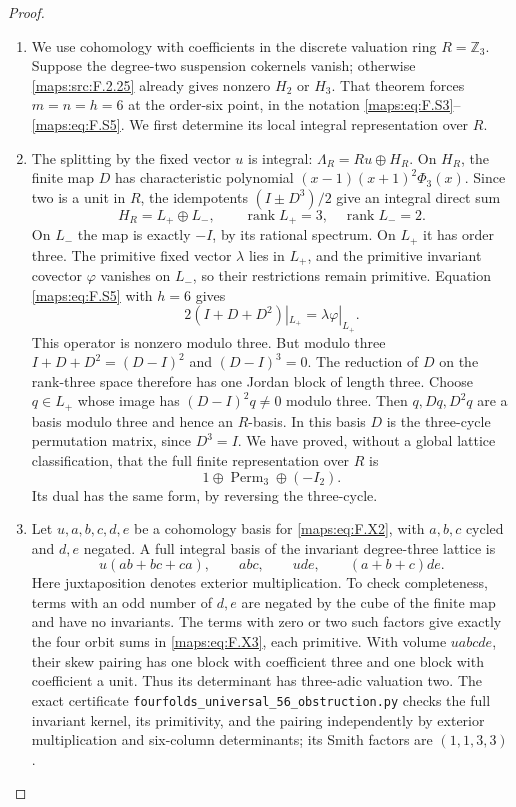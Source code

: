 \documentclass[11pt,a4paper]{article}
\theoremstyle{definition}
\begin{document}
\begin{proof}
\begin{enumerate}[label=\arabic*.]
\item We use cohomology with coefficients in the discrete valuation
ring $R=\mathbb Z_3$.  Suppose the degree-two suspension
cokernels vanish; otherwise \ref{maps:src:F.2.25} already gives nonzero
$H_2$ or $H_3$.  That theorem forces $m=n=h=6$ at the
order-six point, in the notation \eqref{maps:eq:F.S3}--\eqref{maps:eq:F.S5}.
We first determine its local integral representation over $R$.

\item The splitting by the fixed vector $u$ is integral:
$\Lambda_R=Ru\oplus H_R$.  On $H_R$, the finite map $D$
has characteristic polynomial
$(x-1)(x+1)^2\Phi_3(x)$.  Since two is a unit in $R$,
the idempotents $(I\pm D^3)/2$ give an integral direct sum
\[
 H_R=L_+\oplus L_-,\qquad
 \operatorname{rank}L_+=3,\quad
 \operatorname{rank}L_-=2.
\]
On $L_-$ the map is exactly $-I$, by its rational spectrum.
On $L_+$ it has order three.  The primitive fixed vector
$\lambda$ lies in $L_+$, and the primitive invariant
covector $\varphi$ vanishes on $L_-$, so their restrictions
remain primitive.  Equation \eqref{maps:eq:F.S5} with $h=6$ gives
\[
 2(I+D+D^2)|_{L_+}=\lambda\varphi|_{L_+}.
 \tag{F.X1}\label{maps:eq:F.X1}
\]
This operator is nonzero modulo three.  But modulo three
$I+D+D^2=(D-I)^2$ and $(D-I)^3=0$.  The reduction of $D$
on the rank-three space therefore has one Jordan block
of length three.  Choose $q\in L_+$ whose image has
$(D-I)^2q\ne0$ modulo three.  Then $q,Dq,D^2q$ are a
basis modulo three and hence an $R$-basis.  In this basis
$D$ is the three-cycle permutation matrix, since $D^3=I$.
We have proved, without a global lattice classification,
that the full finite representation over $R$ is
\[
                   1\oplus\operatorname{Perm}_3\oplus(-I_2).
 \tag{F.X2}\label{maps:eq:F.X2}
\]
Its dual has the same form, by reversing the three-cycle.

\item Let $u,a,b,c,d,e$ be a cohomology basis for \eqref{maps:eq:F.X2}, with
$a,b,c$ cycled and $d,e$ negated.  A full integral basis
of the invariant degree-three lattice is
\[
 u(ab+bc+ca),\qquad abc,\qquad ude,\qquad(a+b+c)de.
 \tag{F.X3}\label{maps:eq:F.X3}
\]
Here juxtaposition denotes exterior multiplication.
To check completeness, terms with an odd number of
$d,e$ are negated by the cube of the finite map and
have no invariants.  The terms with zero or two such
factors give exactly the four orbit sums in \eqref{maps:eq:F.X3},
each primitive.  With volume $uabcde$, their skew
pairing has one block with coefficient three and one
block with coefficient a unit.  Thus its determinant
has three-adic valuation two.  The exact certificate
\texttt{fourfolds\_universal\_56\_obstruction.py} checks
the full invariant kernel, its primitivity, and the
pairing independently by exterior multiplication and
six-column determinants; its Smith factors are
$(1,1,3,3)$.


\end{enumerate}
\end{proof}
\end{document}
